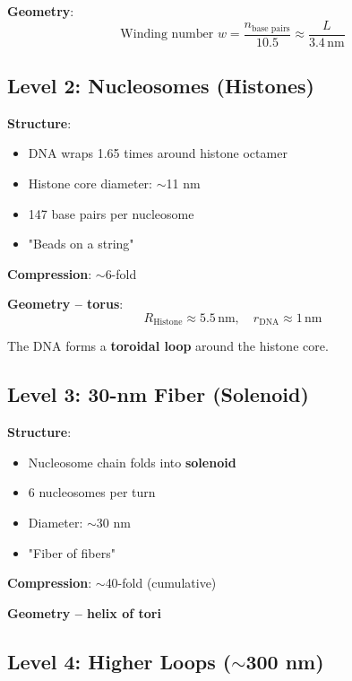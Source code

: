 	\textbf{Geometry}:
	\begin{equation}
		\text{Winding number } w = \frac{n_{\text{base pairs}}}{10.5} \approx \frac{L}{3.4\,\text{nm}}
	\end{equation}

	\subsection{Level 2: Nucleosomes (Histones)}

	\textbf{Structure}:
	\begin{itemize}
		\item DNA wraps 1.65 times around histone octamer
		\item Histone core diameter: $\sim$11 nm
		\item 147 base pairs per nucleosome
		\item "Beads on a string"
	\end{itemize}

	\textbf{Compression}: $\sim$6-fold

	\textbf{Geometry -- torus}:
	\begin{equation}
		R_{\text{Histone}} \approx 5.5\,\text{nm}, \quad r_{\text{DNA}} \approx 1\,\text{nm}
	\end{equation}

	The DNA forms a \textbf{toroidal loop} around the histone core.

	\subsection{Level 3: 30-nm Fiber (Solenoid)}

	\textbf{Structure}:
	\begin{itemize}
		\item Nucleosome chain folds into \textbf{solenoid}
		\item 6 nucleosomes per turn
		\item Diameter: $\sim$30 nm
		\item "Fiber of fibers"
	\end{itemize}

	\textbf{Compression}: $\sim$40-fold (cumulative)

	\textbf{Geometry -- helix of tori}

	\subsection{Level 4: Higher Loops ($\sim$300 nm)}

